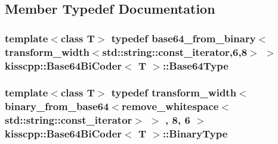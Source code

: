 \subsection{Member Typedef Documentation}
\hypertarget{a00019_a54d2f4ba00e068e8d4d6fd6497ebf21d}{
\subsubsection[{Base64\-Type}]{\setlength{\rightskip}{0pt plus 5cm}template$<$class T$>$ typedef base64\-\_\-from\-\_\-binary$<$transform\-\_\-width$<$std\-::string\-::const\-\_\-iterator,6,8$>$ $>$ {\bf kisscpp\-::\-Base64\-Bi\-Coder}$<$ T $>$\-::{\bf Base64\-Type}}}\label{a00019_a54d2f4ba00e068e8d4d6fd6497ebf21d}
\hypertarget{a00019_a3d4011fcafbdf230c7cc8188714ed499}{
\subsubsection[{Binary\-Type}]{\setlength{\rightskip}{0pt plus 5cm}template$<$class T$>$ typedef transform\-\_\-width$<$ binary\-\_\-from\-\_\-base64$<$remove\-\_\-whitespace$<$std\-::string\-::const\-\_\-iterator$>$ $>$ , 8, 6 $>$ {\bf kisscpp\-::\-Base64\-Bi\-Coder}$<$ T $>$\-::{\bf Binary\-Type}}}\label{a00019_a3d4011fcafbdf230c7cc8188714ed499}


